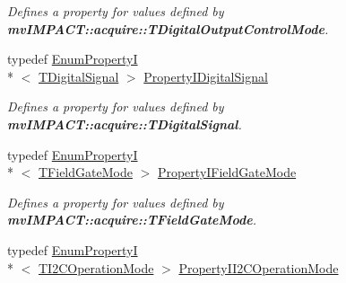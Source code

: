 \begin{DoxyCompactItemize}
\begin{DoxyCompactList}\small\item\em Defines a property for values defined by {\bfseries mv\+I\+M\+P\+A\+C\+T\+::acquire\+::\+T\+Digital\+Output\+Control\+Mode}. \end{DoxyCompactList}\item 
\hypertarget{group___device_specific_interface_gacc6f7760bd2f88895f8d5d63ce364132}{typedef \hyperlink{classmv_i_m_p_a_c_t_1_1acquire_1_1_enum_property_i}{Enum\+Property\+I}\\*
$<$ \hyperlink{group___device_specific_interface_ga29840a466892bced617a5f3a6edb5218}{T\+Digital\+Signal} $>$ \hyperlink{group___device_specific_interface_gacc6f7760bd2f88895f8d5d63ce364132}{Property\+I\+Digital\+Signal}}\label{group___device_specific_interface_gacc6f7760bd2f88895f8d5d63ce364132}

\begin{DoxyCompactList}\small\item\em Defines a property for values defined by {\bfseries mv\+I\+M\+P\+A\+C\+T\+::acquire\+::\+T\+Digital\+Signal}. \end{DoxyCompactList}\item 
\hypertarget{group___device_specific_interface_ga625ac6e1557893c15272ebbbeab39958}{typedef \hyperlink{classmv_i_m_p_a_c_t_1_1acquire_1_1_enum_property_i}{Enum\+Property\+I}\\*
$<$ \hyperlink{group___device_specific_interface_gaa9f27b2d9c8c322f6d2f5eae6dbb18d1}{T\+Field\+Gate\+Mode} $>$ \hyperlink{group___device_specific_interface_ga625ac6e1557893c15272ebbbeab39958}{Property\+I\+Field\+Gate\+Mode}}\label{group___device_specific_interface_ga625ac6e1557893c15272ebbbeab39958}

\begin{DoxyCompactList}\small\item\em Defines a property for values defined by {\bfseries mv\+I\+M\+P\+A\+C\+T\+::acquire\+::\+T\+Field\+Gate\+Mode}. \end{DoxyCompactList}\item 
\hypertarget{group___device_specific_interface_ga605f7a21a4a20a008acbd59d6f18f3e9}{typedef \hyperlink{classmv_i_m_p_a_c_t_1_1acquire_1_1_enum_property_i}{Enum\+Property\+I}\\*
$<$ \hyperlink{group___device_specific_interface_ga71e1af152f11720b7603b40de13855dc}{T\+I2\+C\+Operation\+Mode} $>$ \hyperlink{group___device_specific_interface_ga605f7a21a4a20a008acbd59d6f18f3e9}{Property\+I\+I2\+C\+Operation\+Mode}}\label{group___device_specific_interface_ga605f7a21a4a20a008acbd59d6f18f3e9}


\end{DoxyCompactItemize}

